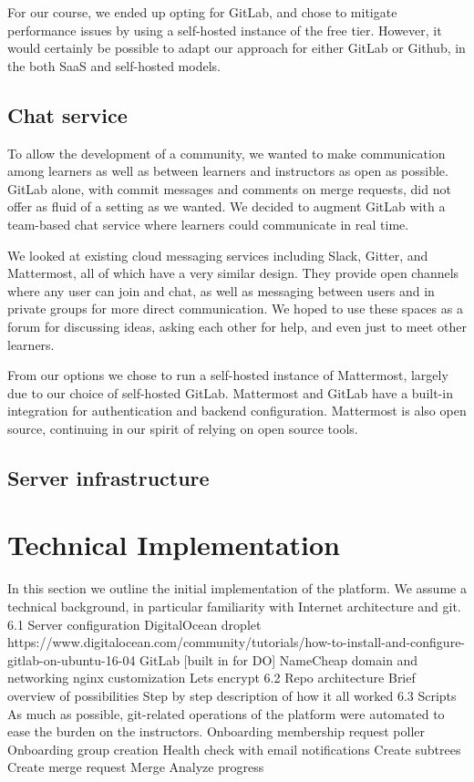 \documentclass[12pt,twoside,vi]{mitthesis}
\begin{document}
For our course, we ended up opting for GitLab, and chose to mitigate performance issues by using a self-hosted instance of the free tier. However, it would certainly be possible to adapt our approach for either GitLab or Github, in the both SaaS and self-hosted models.

\subsection{Chat service}

To allow the development of a community, we wanted to make communication among learners as well as between learners and instructors as open as possible. GitLab alone, with commit messages and comments on merge requests, did not offer as fluid of a setting as we wanted. We decided to augment GitLab with a team-based chat service where learners could communicate in real time.

We looked at existing cloud messaging services including Slack, Gitter, and Mattermost, all of which have a very similar design. They provide open channels where any user can join and chat, as well as messaging between users and in private groups for more direct communication. We hoped to use these spaces as a forum for discussing ideas, asking each other for help, and even just to meet other learners.

From our options we chose to run a self-hosted instance of Mattermost, largely due to our choice of self-hosted GitLab. Mattermost and GitLab have a built-in integration for authentication and backend configuration. Mattermost is also open source, continuing in our spirit of relying on open source tools.

\subsection{Server infrastructure}

\section{Technical Implementation}

In this section we outline the initial implementation of the platform. We assume a technical background, in particular familiarity with Internet architecture and git.
6.1 Server configuration
DigitalOcean droplet https://www.digitalocean.com/community/tutorials/how-to-install-and-configure-gitlab-on-ubuntu-16-04 
GitLab [built in for DO]
NameCheap domain and networking
nginx customization
Lets encrypt
6.2 Repo architecture
Brief overview of possibilities
Step by step description of how it all worked
6.3 Scripts
As much as possible, git-related operations of the platform were automated to ease the burden on the instructors. 
Onboarding membership request poller
Onboarding group creation
Health check with email notifications
Create subtrees
Create merge request
Merge
Analyze progress
\end{document}
